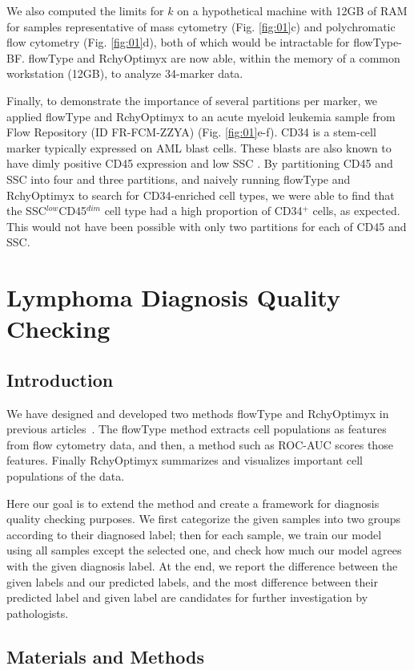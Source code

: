 We also computed the limits for $k$ on a hypothetical machine with 12GB of RAM for samples representative of mass cytometry (Fig. \ref{fig:01}c) and polychromatic flow cytometry (Fig. \ref{fig:01}d), both of which would be intractable for flowType-BF.
flowType and RchyOptimyx are now able, within the memory of a common workstation (12GB), to analyze 34-marker data. 

Finally, to demonstrate the importance of several partitions per marker, we applied flowType and RchyOptimyx to an acute myeloid leukemia sample from Flow Repository (ID FR-FCM-ZZYA) (Fig. \ref{fig:01}e-f).
CD34 is a stem-cell marker typically expressed on AML blast cells. These blasts are also known to have dimly positive CD45 expression and low SSC \cite{Vial2001}. 
By partitioning CD45 and SSC into four and three partitions, and naively running flowType and RchyOptimyx to search for CD34-enriched cell types, we were able to find that the SSC$^{low}$CD45$^{dim}$ cell type had a high proportion of CD34$^+$ cells, as expected.
This would not have been possible with only two partitions for each of CD45 and SSC.


\section{Lymphoma Diagnosis Quality Checking}
\subsection{Introduction}
We have designed and developed two methods flowType and RchyOptimyx in previous articles~\cite{Aghaeepour2012, Aghaeepour2012a, o2014enhanced}. The flowType method extracts cell populations as features from flow cytometry data, and then, a method such as ROC-AUC scores those features. Finally RchyOptimyx summarizes and visualizes important cell populations of the data.

Here our goal is to extend the method and create a framework for diagnosis quality checking purposes. We first categorize the given samples into two groups according to their diagnosed label; then for each sample, we train our model using all samples except the selected one, and check how much our model agrees with the given diagnosis label. At the end, we report the difference between the given labels and our predicted labels, and the most difference between their predicted label and given label are candidates for further investigation by pathologists.
\subsection{Materials and Methods}
